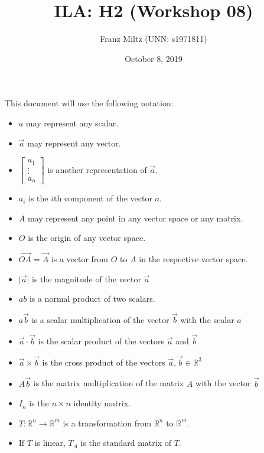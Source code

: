 \documentclass{article}
\title{ILA: H2 (Workshop 08)}
\author{Franz Miltz (UNN: s1971811)}
\date{October 8, 2019}
\begin{document}
\maketitle
This document will use the following notation:
\begin{itemize}
    \item $a$ may represent any scalar.
    \item $\vec{a}$ may represent any vector.
    \item $\begin{bmatrix}
                  a_1    \\
                  \vdots \\
                  a_n
              \end{bmatrix}$ is another representation of $\vec a$.
    \item $a_i$ is the $i$th component of the vector $a$.
    \item $A$ may represent any point in any vector space or any matrix.
    \item $O$ is the origin of any vector space.
    \item $\vec{OA}=\vec{A}$ is a vector from $O$ to $A$ in the respective vector space.
    \item $\vert\vec{a}\vert$ is the magnitude of the vector $\vec{a}$
    \item $ab$ is a normal product of two scalars.
    \item $a\vec{b}$ is a scalar multiplication of the vector $\vec{b}$ with the scalar $a$
    \item $\vec{a}\cdot\vec{b}$ is the scalar product of the vectors $\vec{a}$ and $\vec{b}$
    \item $\vec a\times\vec b$ is the cross product of the vectors $\vec a, \vec b \in \mathbb{R}^3$
    \item $A\vec b$ is the matrix multiplication of the matrix $A$ with the vector $\vec b$
    \item $I_n$ is the $n\times n$ identity matrix.
    \item $T:\mathbb{R}^n\to\mathbb{R}^m$ is a transformation from $\mathbb{R}^n$ to $\mathbb{R}^m$.
    \item If $T$ is linear, $T_A$ is the standard matrix of $T$.
\end{itemize}
\end{document}
